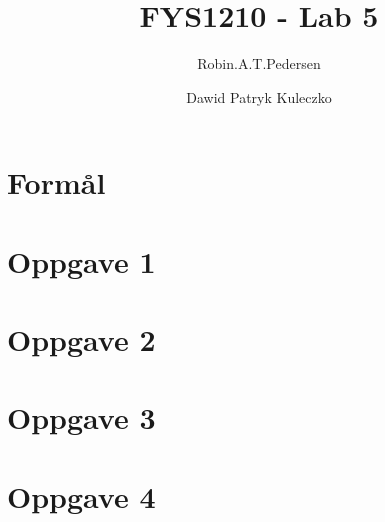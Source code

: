 \documentclass{article}
\begin{document}
\title{FYS1210 - Lab 5}
\author{Robin.A.T.Pedersen \and Dawid Patryk Kuleczko}
\maketitle

\section{Formål}


\section{Oppgave 1}


\section{Oppgave 2}


\section{Oppgave 3}


\section{Oppgave 4}

\end{document}
